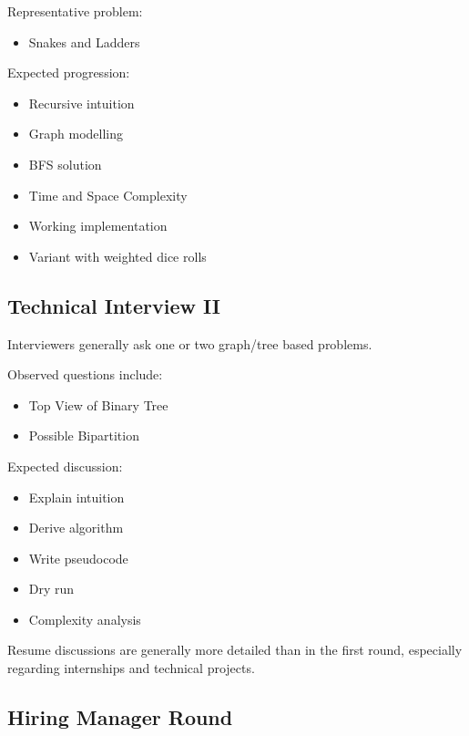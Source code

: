 \documentclass[11pt,a4paper]{article}
\begin{document}
Representative problem:

\begin{itemize}
	\item Snakes and Ladders
\end{itemize}

Expected progression:

\begin{itemize}
	\item Recursive intuition
	\item Graph modelling
	\item BFS solution
	\item Time and Space Complexity
	\item Working implementation
	\item Variant with weighted dice rolls
\end{itemize}


\subsection{Technical Interview II}

Interviewers generally ask one or two graph/tree based problems.

Observed questions include:

\begin{itemize}
	\item Top View of Binary Tree
	\item Possible Bipartition
\end{itemize}

Expected discussion:

\begin{itemize}
	\item Explain intuition
	\item Derive algorithm
	\item Write pseudocode
	\item Dry run
	\item Complexity analysis
\end{itemize}

Resume discussions are generally more detailed than in the first round, especially regarding internships and technical projects.


\subsection{Hiring Manager Round}
\end{document}
